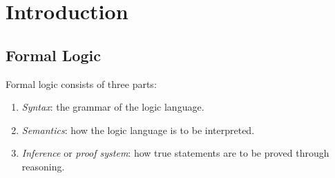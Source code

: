 \chapter{Introduction}

\section{Formal Logic}

Formal logic consists of three parts:

\begin{enumerate}
    \item \textit{Syntax}: the grammar of the logic language.
    \item \textit{Semantics}: how the logic language is to be interpreted.
    \item \textit{Inference} or \textit{proof system}: how true statements are
        to be proved through reasoning.
\end{enumerate}
